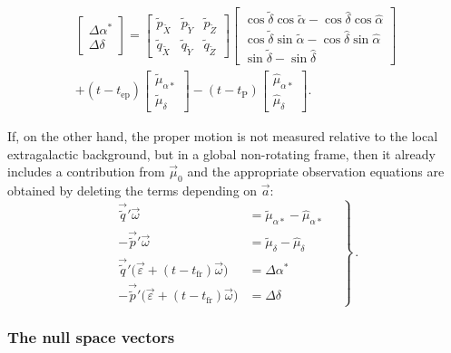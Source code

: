 \documentclass[structabstract]{aa}
\begin{document}
\begin{multline}\label{eq:fr-Delta1}
\begin{bmatrix} \Delta\alpha^*\\ \Delta\delta \end{bmatrix}
= 
\begin{bmatrix} 
\tilde{p}_{\tilde{X}} & \tilde{p}_{\tilde{Y}} & \tilde{p}_{\tilde{Z}}\\ 
\tilde{q}_{\tilde{X}} & \tilde{q}_{\tilde{Y}} & \tilde{q}_{\tilde{Z}}
\end{bmatrix}
\begin{bmatrix} 
\cos\tilde{\delta}\cos\tilde{\alpha} - \cos\hat{\delta}\cos\hat{\alpha}\\ 
\cos\tilde{\delta}\sin\tilde{\alpha} - \cos\hat{\delta}\sin\hat{\alpha}\\ 
\sin\tilde{\delta} - \sin\hat{\delta}
\end{bmatrix} \\
+ (t-t_\text{ep})
\begin{bmatrix} \tilde{\mu}_{\alpha*}\\ \tilde{\mu}_\delta \end{bmatrix}
- (t-t_\text{P})
\begin{bmatrix} \hat{\mu}_{\alpha*}\\ \hat{\mu}_\delta \end{bmatrix} .
\end{multline}

If, on the other hand, the proper motion is not measured relative to the
local extragalactic background, but in a global non-rotating frame, then
it already includes a contribution from $\vec{\mu}_0$ and the appropriate 
observation equations are obtained by deleting the terms depending on
$\vec{a}$:
\begin{equation}\label{eq:cond-mu3}
\left.
\begin{aligned}
\vec{\tilde{q}}'\vec{\omega} &= \tilde{\mu}_{\alpha*}-\hat{\mu}_{\alpha*}\\[3pt]
-\vec{\tilde{p}}'\vec{\omega} &= \tilde{\mu}_{\delta}-\hat{\mu}_{\delta}\\[3pt]
\vec{\tilde{q}}'\big(\vec{\varepsilon}+(t-t_\text{fr})\vec{\omega}\big)
&= \Delta\alpha^* \\[3pt]
-\vec{\tilde{p}}'\big(\vec{\varepsilon}+(t-t_\text{fr})\vec{\omega}\big)
&= \Delta\delta
\end{aligned}
\quad\right\} \, .
\end{equation}


\subsubsection{The null space vectors}\label{sec:nullsp}
\end{document}
